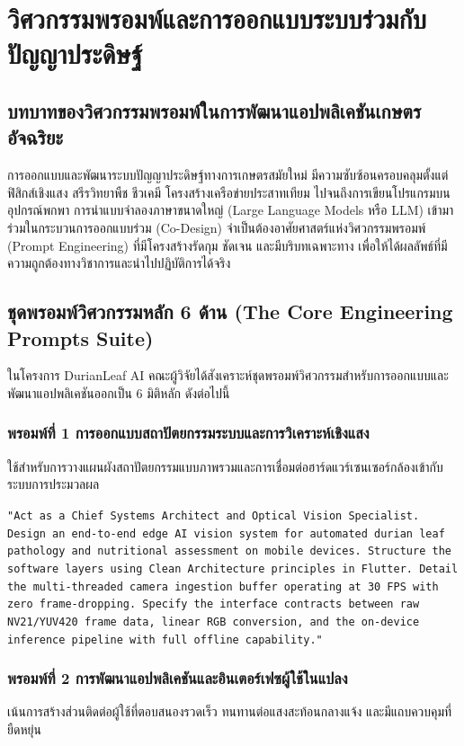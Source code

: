 \chapter{วิศวกรรมพรอมพ์และการออกแบบระบบร่วมกับปัญญาประดิษฐ์}

\section{บทบาทของวิศวกรรมพรอมพ์ในการพัฒนาแอปพลิเคชันเกษตรอัจฉริยะ}
การออกแบบและพัฒนาระบบปัญญาประดิษฐ์ทางการเกษตรสมัยใหม่ มีความซับซ้อนครอบคลุมตั้งแต่ฟิสิกส์เชิงแสง สรีรวิทยาพืช ชีวเคมี โครงสร้างเครือข่ายประสาทเทียม ไปจนถึงการเขียนโปรแกรมบนอุปกรณ์พกพา การนำแบบจำลองภาษาขนาดใหญ่ (Large Language Models หรือ LLM) เข้ามาร่วมในกระบวนการออกแบบร่วม (Co-Design) จำเป็นต้องอาศัยศาสตร์แห่งวิศวกรรมพรอมพ์ (Prompt Engineering) ที่มีโครงสร้างรัดกุม ชัดเจน และมีบริบทเฉพาะทาง เพื่อให้ได้ผลลัพธ์ที่มีความถูกต้องทางวิชาการและนำไปปฏิบัติการได้จริง

\section{ชุดพรอมพ์วิศวกรรมหลัก 6 ด้าน (The Core Engineering Prompts Suite)}
ในโครงการ DurianLeaf AI คณะผู้วิจัยได้สังเคราะห์ชุดพรอมพ์วิศวกรรมสำหรับการออกแบบและพัฒนาแอปพลิเคชันออกเป็น 6 มิติหลัก ดังต่อไปนี้

\subsection{พรอมพ์ที่ 1 การออกแบบสถาปัตยกรรมระบบและการวิเคราะห์เชิงแสง}
ใช้สำหรับการวางแผนผังสถาปัตยกรรมแบบภาพรวมและการเชื่อมต่อฮาร์ดแวร์เซนเซอร์กล้องเข้ากับระบบการประมวลผล

\begin{promptbox}[title={พรอมพ์ที่ 1 สถาปัตยกรรมระบบและการวิเคราะห์ภาพเชิงแสง}]
\texttt{"Act as a Chief Systems Architect and Optical Vision Specialist. Design an end-to-end edge AI vision system for automated durian leaf pathology and nutritional assessment on mobile devices. Structure the software layers using Clean Architecture principles in Flutter. Detail the multi-threaded camera ingestion buffer operating at 30 FPS with zero frame-dropping. Specify the interface contracts between raw NV21/YUV420 frame data, linear RGB conversion, and the on-device inference pipeline with full offline capability."}
\end{promptbox}

\subsection{พรอมพ์ที่ 2 การพัฒนาแอปพลิเคชันและอินเตอร์เฟซผู้ใช้ในแปลง}
เน้นการสร้างส่วนติดต่อผู้ใช้ที่ตอบสนองรวดเร็ว ทนทานต่อแสงสะท้อนกลางแจ้ง และมีแถบควบคุมที่ยืดหยุ่น

